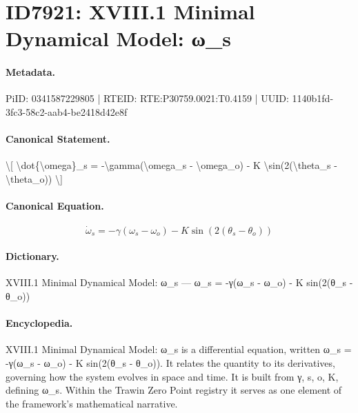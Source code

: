 \section*{ID7921: XVIII.1 Minimal Dynamical Model: ω\_s}
\paragraph{Metadata.}
PiID: 0341587229805 | RTEID: RTE:P30759.0021:T0.4159 | UUID: 1140b1fd-3fc3-58c2-aab4-be2418d42e8f

\paragraph{Canonical Statement.}
\textbackslash{}[ \textbackslash{}dot\{\textbackslash{}omega\}\_s = -\textbackslash{}gamma(\textbackslash{}omega\_s - \textbackslash{}omega\_o) - K \textbackslash{}sin(2(\textbackslash{}theta\_s - \textbackslash{}theta\_o)) \textbackslash{}]

\paragraph{Canonical Equation.}
\[
\dot{\omega}_s = -\gamma(\omega_s - \omega_o) - K \sin(2(\theta_s - \theta_o))
\]

\paragraph{Dictionary.}
XVIII.1 Minimal Dynamical Model: ω\_s — ω\_s = -γ(ω\_s - ω\_o) - K sin(2(θ\_s - θ\_o))

\paragraph{Encyclopedia.}
XVIII.1 Minimal Dynamical Model: ω\_s is a differential equation, written ω\_s = -γ(ω\_s - ω\_o) - K sin(2(θ\_s - θ\_o)). It relates the quantity to its derivatives, governing how the system evolves in space and time. It is built from γ, s, o, K, defining ω\_s. Within the Trawin Zero Point registry it serves as one element of the framework's mathematical narrative.

